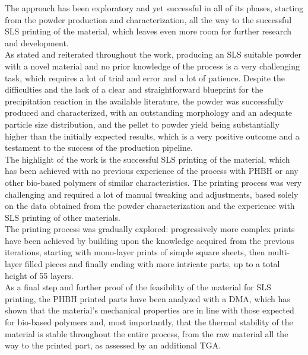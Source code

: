 \documentclass{article}
\begin{document}
    The approach has been exploratory and yet successful in all of its phases, starting from the powder production and characterization, all the way to the successful 
    SLS printing of the material, which leaves even more room for further research and development. \\ 

    As stated and reiterated throughout the work, producing an SLS suitable powder with a novel material and no prior knowledge of the process is a 
    very challenging task, which requires a lot of trial and error and a lot of patience. Despite the difficulties and the lack of a clear and 
    straightforward blueprint for the precipitation reaction in the available literature, the powder was successfully produced and characterized, 
    with an outstanding morphology and an adequate particle size distribution, and the pellet to powder yield being
    substantially higher than the initially expected results, which is a very positive outcome and a testament to the success of the 
    production pipeline. \\ 

    The highlight of the work is the successful SLS printing of the material, which has been achieved with no previous 
    experience of the process with PHBH or any other bio-based polymers of similar characteristics. 
    The printing process was very challenging and required a lot of manual tweaking and adjustments, based solely on the data 
    obtained from the powder characterization and the experience with SLS printing of other materials. \\ 

    The printing process was gradually explored: progressively more complex prints have been achieved by building upon the knowledge 
    acquired from the previous iterations, starting with mono-layer prints of simple square 
    sheets, then multi-layer filled pieces and finally ending with more intricate parts, up to a total height of 55 layers. \\ 

    As a final step and further proof of the feasibility of the material for SLS printing, the PHBH printed parts have been 
    analyzed with a DMA, which has shown that the material's mechanical properties are in line with those expected for bio-based polymers 
    and, most importantly, that the thermal stability of the material is stable throughout the entire process, from the raw material all the way to the 
    printed part, as assessed by an additional TGA. \\ 
    
\end{document}
